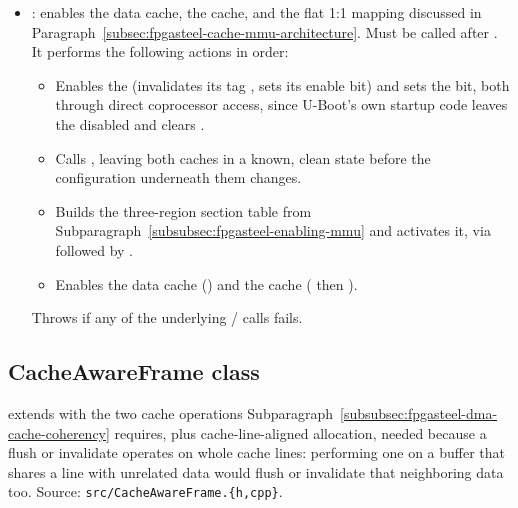 \begin{itemize}
    \item {}: enables the  data cache, the  cache, and the flat 1:1  mapping discussed in Paragraph~\ref{subsec:fpgasteel-cache-mmu-architecture}. Must be called after . It performs the following actions in order:
    \begin{itemize}
        \item Enables the  (invalidates its tag , sets its enable bit) and sets the  bit, both through direct  coprocessor access, since U-Boot's own startup code leaves the  disabled and clears .
        \item Calls , leaving both caches in a known, clean state before the  configuration underneath them changes.
        \item Builds the three-region section table from Subparagraph~\ref{subsubsec:fpgasteel-enabling-mmu} and activates it, via  followed by .
        \item Enables the  data cache () and the  cache ( then ).
    \end{itemize}
    Throws  if any of the underlying / calls fails.
\end{itemize}

\subsection{CacheAwareFrame class}
\label{subsec:fpgasteel-cache-aware-frame}

 extends  with the two cache operations Subparagraph~\ref{subsubsec:fpgasteel-dma-cache-coherency} requires, plus cache-line-aligned allocation, needed because a flush or invalidate operates on whole cache lines: performing one on a buffer that shares a line with unrelated data would flush or invalidate that neighboring data too. Source: \lstinline[style=inlineFsRepo]!src/CacheAwareFrame.{h,cpp}!.

